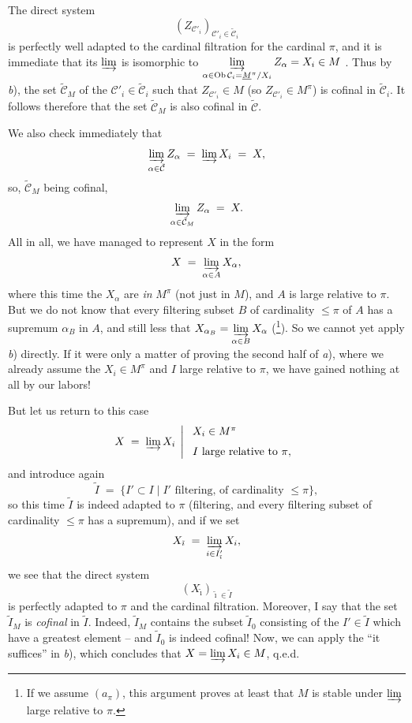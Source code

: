 The direct system
\[ (Z_{\mathcal{C}'_i})_{\mathcal{C}'_i\in\tilde{\mathcal{C}}_i} \]
is perfectly well adapted to the cardinal filtration for the cardinal $\pi$, and it is immediate that its $\varinjlim$ is isomorphic to $\varinjlim\limits_{\alpha\in\operatorname{Ob}\mathcal{C}_i=\underline{M}^\pi/X_i} Z_\alpha = X_i\in M$ . Thus by \textit{b}), the set $\tilde{\mathcal{C}}_M$ of the $\mathcal{C}'_i\in\tilde{\mathcal{C}}_i$ such that $Z_{\mathcal{C}'_i}\in M$ (so $Z_{\mathcal{C}'_i}\in M^\pi$) is cofinal in $\tilde{\mathcal{C}}_i$. It follows therefore that the set $\tilde{\mathcal{C}}_M$ is also cofinal in $\tilde{\mathcal{C}}$.


We also check immediately that
\[ \varinjlim_{\alpha\in\tilde{\mathcal{C}}} Z_\alpha \;=\; \varinjlim X_i \;=\; X, \]
so, $\tilde{\mathcal{C}}_M$ being cofinal,
\[ \varinjlim_{\alpha\in\tilde{\mathcal{C}}_M} Z_\alpha \;=\; X. \]
All in all, we have managed to represent $X$ in the form
\[ X \;=\; \varinjlim_{\alpha\in A} X_\alpha, \]
where this time the $X_\alpha$ are \textit{in} $M^\pi$ (not just in $M$), and $A$ is large relative to $\pi$. But we do not know that every filtering subset $B$ of cardinality $\le\pi$ of $A$ has a supremum $\alpha_B$ in $A$, and still less that $X_{\alpha_B} = \varinjlim\limits_{\alpha\in B} X_\alpha$ (\footnote[45]{If we assume $(a_\pi)$, this argument proves at least that $M$ is stable under $\varinjlim$ large relative to $\pi$.}). So we cannot yet apply \textit{b}) directly. If it were only a matter of proving the second half of \textit{a}), where we already assume the $X_i\in M^\pi$ and $I$ large relative to $\pi$, we have gained nothing at all by our labors!

But let us return to this case
\[ X \;=\; \varinjlim X_i \;\left|\; \begin{array}{l} X_i\in M^\pi \\[1.5ex] I \text{ large relative to } \pi, \end{array}\right. \]
and introduce again
\[ \tilde{I} \;=\; \{I'\subset I \mid I' \text{ filtering, of cardinality } \le\pi\}, \]
so this time $\tilde{I}$ is indeed adapted to $\pi$ (filtering, and every filtering subset of cardinality $\le\pi$ has a supremum), and if we set
\[ X_{\tilde{\imath}} \;=\; \varinjlim_{i\in I'_{\tilde{\imath}}} X_i, \]
we see that the direct system
\[ (X_{\tilde{\imath}})_{\tilde{\imath}\in\tilde{I}} \]
is perfectly adapted to $\pi$ and the cardinal filtration. Moreover, I say that the set $\tilde{I}_M$ is \textit{cofinal} in $\tilde{I}$. Indeed, $\tilde{I}_M$ contains the subset $\tilde{I}_0$ consisting of the $I'\in\tilde{I}$ which have a greatest element -- and $\tilde{I}_0$ is indeed cofinal! Now, we can apply
the ``it suffices'' in \textit{b}), which concludes that $X = \varinjlim X_i\in M$, q.e.d. %

